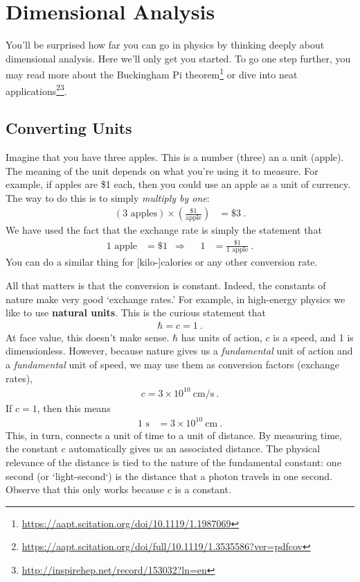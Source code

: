 \section{Dimensional Analysis}

You’ll be surprised how far you can go in physics by thinking deeply about dimensional analysis. Here we’ll only get you started. To go one step further, you may read more about the Buckingham Pi theorem\footnote{\url{https://aapt.scitation.org/doi/10.1119/1.1987069}} or dive into neat applications\footnote{\url{https://aapt.scitation.org/doi/full/10.1119/1.3535586?ver=pdfcov}}\footnote{\url{http://inspirehep.net/record/153032?ln=en}}.

\subsection{Converting Units}

Imagine that you have three apples. This is a number (three) an a unit (apple). The meaning of the unit depends on what you’re using it to measure. For example, if apples are \$1 each, then you could use an apple as a unit of currency. The way to do this is to simply \emph{multiply by one}:
\begin{align}
  (3\text{ apples}) \times \left(\frac{\text{\$ 1}}{\text{apple}}\right)
  &= \$ 3 \ .
\end{align}
We have used the fact that the exchange rate is simply the statement that
\begin{align}
  1\text{ apple} &= \$1
  & \Rightarrow &&
  1 &= \frac{\$ 1}{1\text{ apple}} \ .
\end{align}
You can do a similar thing for [kilo-]calories or any other conversion rate. 


All that matters is that the conversion is constant. Indeed, the constants of nature make very good `exchange rates.' For example, in high-energy physics we like to use \textbf{natural units}. This is the curious statement that
\begin{align}
  \hbar = c = 1 \ .
\end{align}
At face value, this doesn’t make sense. $\hbar$ has units of action, $c$ is a speed, and 1 is dimensionless. However, because nature gives us a \emph{fundamental} unit of action and a \emph{fundamental} unit of speed, we may use them as conversion factors (exchange rates),
\begin{align}
  c = 3 \times 10^{10}~\text{cm}/\text{s} \ .
\end{align}
If $c=1$, then this means
\begin{align}
  1 \text{ s} &=  3 \times 10^{10}~\text{cm} \ .
\end{align}
This, in turn, connects a unit of time to a unit of distance. By measuring time, the constant $c$ automatically gives us an associated distance. The physical relevance of the distance is tied to the nature of the fundamental constant: one second (or `light-second‘) is the distance that a photon travels in one second. Observe that this only works because $c$ is a constant. 

